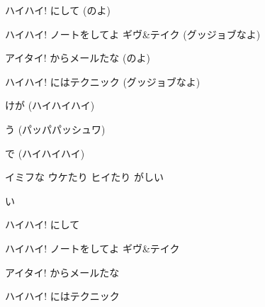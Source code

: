 \documentclass[14pt]{extreport}
\begin{document}
{\item
  ハイハイ!  にして (のよ)
  \jisho{}

  ハイハイ! ノートをしてよ ギヴ\&テイク (グッジョブなよ)
  \jisho{}

  アイタイ! からメールたな (のよ)
  \jisho{}

  ハイハイ! にはテクニック (グッジョブなよ)
  \jisho{}

  けが (ハイハイハイ)
  \jisho{}

  う (パッパパッシュワ)
  \jisho{}

  で (ハイハイハイ)
  \jisho{}

  イミフな ウケたり ヒイたり がしい
  \jisho{}

  い
  \jisho{}

\item
  ハイハイ!  にして
  \jisho{}

  ハイハイ! ノートをしてよ ギヴ\&テイク
  \jisho{}

  アイタイ! からメールたな
  \jisho{}

  ハイハイ! にはテクニック
  \jisho{}

}
\end{document}
